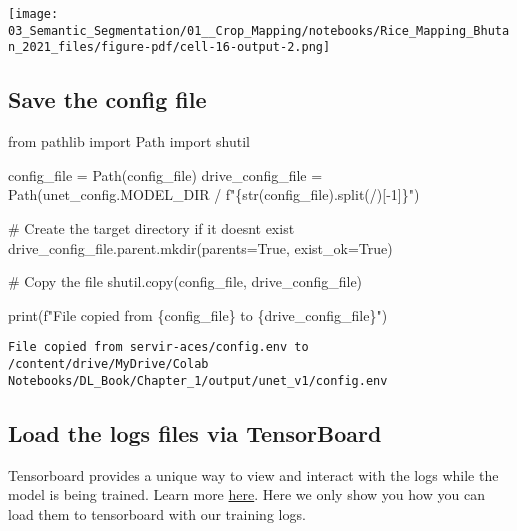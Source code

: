 \documentclass[
  letterpaper,
  DIV=11,
  numbers=noendperiod]{scrreprt}
\newenvironment{Shaded}{\begin{snugshade}}{\end{snugshade}}
\newcommand{\BuiltInTok}[1]{\textcolor[rgb]{0.00,0.23,0.31}{#1}}
\newcommand{\CommentTok}[1]{\textcolor[rgb]{0.37,0.37,0.37}{#1}}
\newcommand{\DecValTok}[1]{\textcolor[rgb]{0.68,0.00,0.00}{#1}}
\newcommand{\ImportTok}[1]{\textcolor[rgb]{0.00,0.46,0.62}{#1}}
\newcommand{\NormalTok}[1]{\textcolor[rgb]{0.00,0.23,0.31}{#1}}
\newcommand{\OperatorTok}[1]{\textcolor[rgb]{0.37,0.37,0.37}{#1}}
\newcommand{\SpecialCharTok}[1]{\textcolor[rgb]{0.37,0.37,0.37}{#1}}
\newcommand{\SpecialStringTok}[1]{\textcolor[rgb]{0.13,0.47,0.30}{#1}}
\newcommand{\StringTok}[1]{\textcolor[rgb]{0.13,0.47,0.30}{#1}}
\newcommand{\VariableTok}[1]{\textcolor[rgb]{0.07,0.07,0.07}{#1}}
\begin{document}
\texttt{[image: 03\_Semantic\_Segmentation/01\_\_Crop\_Mapping/notebooks/Rice\_Mapping\_Bhutan\_2021\_files/figure-pdf/cell-16-output-2.png]}

\subsection{Save the config file}\label{save-the-config-file}

\begin{Shaded}
\begin{Highlighting}[]
\ImportTok{from}\NormalTok{ pathlib }\ImportTok{import}\NormalTok{ Path}
\ImportTok{import}\NormalTok{ shutil}

\NormalTok{config\_file }\OperatorTok{=}\NormalTok{ Path(config\_file)}
\NormalTok{drive\_config\_file }\OperatorTok{=}\NormalTok{ Path(unet\_config.MODEL\_DIR }\OperatorTok{/} \SpecialStringTok{f"}\SpecialCharTok{\{}\BuiltInTok{str}\NormalTok{(config\_file)}\SpecialCharTok{.}\NormalTok{split(}\StringTok{\textquotesingle{}/\textquotesingle{}}\NormalTok{)[}\OperatorTok{{-}}\DecValTok{1}\NormalTok{]}\SpecialCharTok{\}}\SpecialStringTok{"}\NormalTok{)}

\CommentTok{\# Create the target directory if it doesn\textquotesingle{}t exist}
\NormalTok{drive\_config\_file.parent.mkdir(parents}\OperatorTok{=}\VariableTok{True}\NormalTok{, exist\_ok}\OperatorTok{=}\VariableTok{True}\NormalTok{)}

\CommentTok{\# Copy the file}
\NormalTok{shutil.copy(config\_file, drive\_config\_file)}

\BuiltInTok{print}\NormalTok{(}\SpecialStringTok{f"File copied from }\SpecialCharTok{\{}\NormalTok{config\_file}\SpecialCharTok{\}}\SpecialStringTok{ to }\SpecialCharTok{\{}\NormalTok{drive\_config\_file}\SpecialCharTok{\}}\SpecialStringTok{"}\NormalTok{)}
\end{Highlighting}
\end{Shaded}

\begin{verbatim}
File copied from servir-aces/config.env to /content/drive/MyDrive/Colab Notebooks/DL_Book/Chapter_1/output/unet_v1/config.env
\end{verbatim}

\subsection{Load the logs files via
TensorBoard}\label{load-the-logs-files-via-tensorboard}

Tensorboard provides a unique way to view and interact with the logs
while the model is being trained. Learn more
\href{https://www.tensorflow.org/tensorboard/get_started}{here}. Here we
only show you how you can load them to tensorboard with our training
logs.
\end{document}
